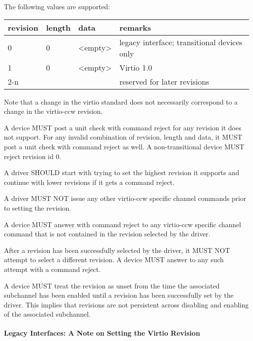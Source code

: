 The following values are supported:

\begin{tabular}{ |l|l|l|l| }
\hline
revision & length & data      & remarks \\
\hline \hline
0        & 0      & <empty>   & legacy interface; transitional devices only \\
\hline
1        & 0      & <empty>   & Virtio 1.0 \\
\hline
2-n      &        &           & reserved for later revisions \\
\hline
\end{tabular}

Note that a change in the virtio standard does not necessarily
correspond to a change in the virtio-ccw revision.

A device MUST post a unit check with command reject for any revision
it does not support. For any invalid combination of revision, length
and data, it MUST post a unit check with command reject as well. A
non-transitional device MUST reject revision id 0.

A driver SHOULD start with trying to set the highest revision it
supports and continue with lower revisions if it gets a command reject.

A driver MUST NOT issue any other virtio-ccw specific channel commands
prior to setting the revision.

A device MUST answer with command reject to any virtio-ccw specific
channel command that is not contained in the revision selected by the
driver.

After a revision has been successfully selected by the driver, it
MUST NOT attempt to select a different revision. A device MUST answer
to any such attempt with a command reject.

A device MUST treat the revision as unset from the time the associated
subchannel has been enabled until a revision has been successfully set
by the driver. This implies that revisions are not persistent across
disabling and enabling of the associated subchannel.

\paragraph{Legacy Interfaces: A Note on Setting the Virtio Revision}\label{sec:Virtio Transport Options / Virtio over channel I/O / Device Initialization / Setting the Virtio Revision / Legacy Interfaces: A Note on Setting the Virtio Revision}

